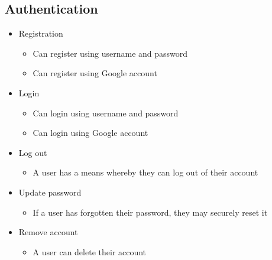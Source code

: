 \documentclass[12pt]{article}
\begin{document}
\subsection{Authentication}
\begin{itemize}
  \item Registration
        \begin{itemize}
          \item Can register using username and password
          \item Can register using Google account
        \end{itemize}
  \item Login
        \begin{itemize}
          \item Can login using username and password
          \item Can login using Google account
        \end{itemize}
  \item Log out
        \begin{itemize}
          \item A user has a means whereby they can log out of their account
        \end{itemize}
  \item Update password
        \begin{itemize}
          \item If a user has forgotten their password, they may securely reset it
        \end{itemize}
  \item Remove account
        \begin{itemize}
          \item A user can delete their account
        \end{itemize}
\end{itemize}
\end{document}
